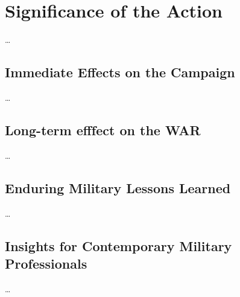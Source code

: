 \section{Significance of the Action}

\ldots

\subsection{Immediate Effects on the Campaign}

\ldots

\subsection{Long-term efffect on the WAR}

\ldots

\subsection{Enduring Military Lessons Learned}

\ldots

\subsection{Insights for Contemporary Military Professionals}

\ldots

